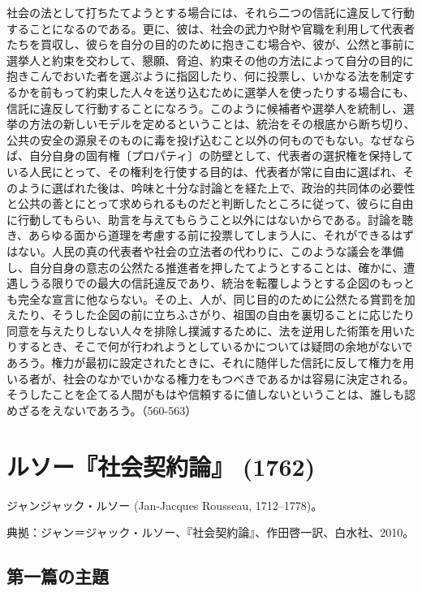 社会の法として打ちたてようとする場合には、それら二つの信託に違反して行動することになるのである。更に、彼は、社会の武力や財や官職を利用して代表者たちを買収し、彼らを自分の目的のために抱きこむ場合や、彼が、公然と事前に選挙人と約束を交わして、懇願、脅迫、約束その他の方法によって自分の目的に抱きこんでおいた者を選ぶように指図したり、何に投票し、いかなる法を制定するかを前もって約束した人々を送り込むために選挙人を使ったりする場合にも、信託に違反して行動することになろう。このように候補者や選挙人を統制し、選挙の方法の新しいモデルを定めるということは、統治をその根底から断ち切り、公共の安全の源泉そのものに毒を投げ込むこと以外の何ものでもない。なぜならば、自分自身の固有権〔プロパティ〕の防壁として、代表者の選択権を保持している人民にとって、その権利を行使する目的は、代表者が常に自由に選ばれ、そのように選ばれた後は、吟味と十分な討論とを経た上で、政治的共同体の必要性と公共の善とにとって求められるものだと判断したところに従って、彼らに自由に行動してもらい、助言を与えてもらうこと以外にはないからである。討論を聴き、あらゆる面から道理を考慮する前に投票してしまう人に、それができるはずはない。人民の真の代表者や社会の立法者の代わりに、このような議会を準備し、自分自身の意志の公然たる推進者を押したてようとすることは、確かに、遭遇しうる限りでの最大の信託違反であり、統治を転覆しようとする企図のもっとも完全な宣言に他ならない。その上、人が、同じ目的のために公然たる賞罰を加えたり、そうした企図の前に立ちふさがり、祖国の自由を裏切ることに応じたり同意を与えたりしない人々を排除し撲滅するために、法を逆用した術策を用いたりするとき、そこで何が行われようとしているかについては疑問の余地がないであろう。権力が最初に設定されたときに、それに随伴した信託に反して権力を用いる者が、社会のなかでいかなる権力をもつべきであるかは容易に決定される。そうしたことを企てる人間がもはや信頼するに値しないということは、誰しも認めざるをえないであろう。（560-563）



\newpage{}

\section{ルソー『社会契約論』 (1762)}

ジャンジャック・ルソー (Jan-Jacques Rousseau, 1712--1778)。

典拠：ジャン＝ジャック・ルソー、『社会契約論』、作田啓一訳、白水社、2010。

\subsection{第一篇の主題}



